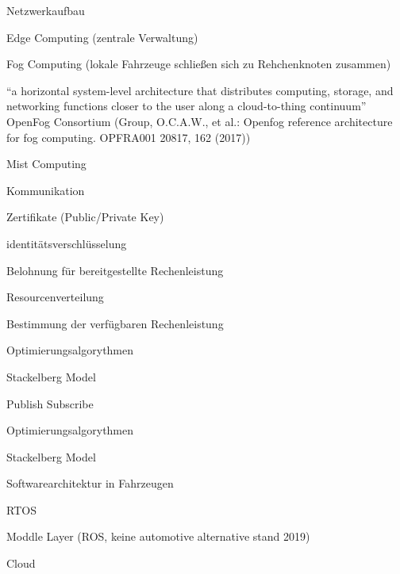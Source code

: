 \begin{notes}
    \item Netzwerkaufbau
    \begin{notes}
        \item Edge Computing (zentrale Verwaltung)
        \item Fog Computing (lokale Fahrzeuge schließen sich zu Rehchenknoten zusammen)
        \item “a horizontal system-level architecture that distributes computing, storage, and networking functions closer to the user along a cloud-to-thing continuum”  OpenFog Consortium (Group, O.C.A.W., et al.: Openfog reference architecture for fog computing. OPFRA001 20817, 162 (2017))
        \item Mist Computing
    \end{notes}
    \item Kommunikation
    \begin{notes}
        \item Zertifikate (Public/Private Key)
        \item identitätsverschlüsselung
        \item Belohnung für bereitgestellte Rechenleistung
    \end{notes}
    \item Resourcenverteilung
    \begin{notes}
        \item Bestimmung der verfügbaren Rechenleistung 
        \item Optimierungsalgorythmen
        \item Stackelberg Model
    \end{notes}
    \item Publish Subscribe
    \begin{notes}
        \item 
        \item Optimierungsalgorythmen
        \item Stackelberg Model
    \end{notes}
    \item Softwarearchitektur in Fahrzeugen
   \begin{notes}
        \item RTOS
        \item Moddle Layer (ROS, keine automotive alternative stand 2019)
        \item Cloud
    \end{notes}
\end{notes}

